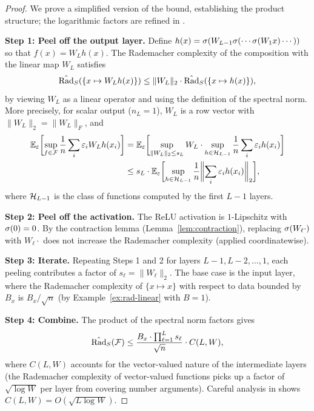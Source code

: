\documentclass[11pt,a4paper]{article}
\begin{document}
\begin{proof}
We prove a simplified version of the bound, establishing the product
structure; the logarithmic factors are refined in
\citet{bartlett2017}.

\textbf{Step 1: Peel off the output layer.}
Define $h(x) = \sigma(W_{L-1} \sigma(\cdots \sigma(W_1 x)
\cdots))$ so that $f(x) = W_L h(x)$.  The Rademacher complexity of
the composition with the linear map $W_L$ satisfies
\[
  \hat{\mathrm{Rad}}_S(\{x \mapsto W_L h(x)\})
  \le \|W_L\|_2 \cdot \hat{\mathrm{Rad}}_S(\{x \mapsto h(x)\}),
\]
by viewing $W_L$ as a linear operator and using the definition of
the spectral norm.  More precisely, for scalar output ($n_L = 1$),
$W_L$ is a row vector with $\|W_L\|_2 = \|W_L\|_F$, and
\begin{align*}
  \mathbb{E}_\varepsilon\biggl[\sup_{f \in \mathcal{F}} \frac{1}{n}
    \sum_i \varepsilon_i W_L h(x_i)\biggr]
  &= \mathbb{E}_\varepsilon\biggl[\sup_{\|W_L\|_2 \le s_L} W_L \cdot
    \sup_{h \in \mathcal{H}_{L-1}} \frac{1}{n}
    \sum_i \varepsilon_i h(x_i)\biggr] \\
  &\le s_L \cdot \mathbb{E}_\varepsilon\biggl[\sup_{h \in \mathcal{H}_{L-1}}
    \frac{1}{n} \biggl\|\sum_i \varepsilon_i h(x_i)\biggr\|_2
    \biggr],
\end{align*}
where $\mathcal{H}_{L-1}$ is the class of functions computed by the first
$L-1$ layers.

\textbf{Step 2: Peel off the activation.}
The ReLU activation is $1$-Lipschitz with $\sigma(0) = 0$.  By
the contraction lemma (Lemma~\ref{lem:contraction}), replacing
$\sigma(W_\ell \cdot)$ with $W_\ell \cdot$ does not increase the
Rademacher complexity (applied coordinatewise).

\textbf{Step 3: Iterate.}
Repeating Steps 1 and 2 for layers $L-1, L-2, \ldots, 1$, each
peeling contributes a factor of $s_\ell = \|W_\ell\|_2$.  The
base case is the input layer, where the Rademacher complexity of
$\{x \mapsto x\}$ with respect to data bounded by $B_x$ is
$B_x / \sqrt{n}$ (by Example~\ref{ex:rad-linear} with $B = 1$).

\textbf{Step 4: Combine.}
The product of the spectral norm factors gives
\[
  \hat{\mathrm{Rad}}_S(\mathcal{F}) \le
  \frac{B_x \cdot \prod_{\ell=1}^{L} s_\ell}{\sqrt{n}}
  \cdot C(L, W),
\]
where $C(L, W)$ accounts for the vector-valued nature of the
intermediate layers (the Rademacher complexity of vector-valued
functions picks up a factor of $\sqrt{\log W}$ per layer from
covering number arguments).  Careful analysis in
\citet{bartlett2017} shows $C(L, W) = O(\sqrt{L \log W})$.
\end{proof}
\end{document}
